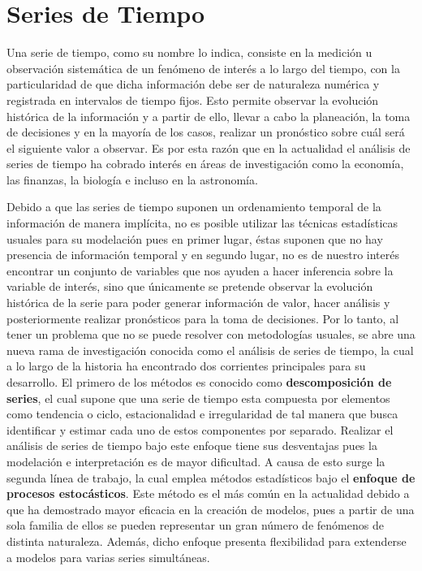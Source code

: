 \section{Series de Tiempo} \label{chap:I(d)}

Una serie de tiempo, como su nombre lo indica, consiste en la medición u observación sistemática de un fenómeno de interés a lo largo del tiempo, con la particularidad de que dicha información debe ser de naturaleza numérica y registrada en intervalos de tiempo fijos.  Esto permite observar la evolución histórica de la información y a partir de ello, llevar a cabo la planeación, la toma de decisiones y en la mayoría de los casos, realizar un pronóstico sobre cuál será el siguiente valor a observar. Es por esta razón que en la actualidad el análisis de series de tiempo ha cobrado interés en áreas de investigación como la economía, las finanzas, la biología e incluso en la astronomía.\newline

Debido a que las series de tiempo suponen un ordenamiento temporal de la información de manera implícita, no es posible utilizar las técnicas estadísticas usuales para su modelación pues en primer lugar, éstas suponen que no hay presencia de información temporal y en segundo lugar, no es de nuestro interés encontrar un conjunto de variables que nos ayuden a hacer inferencia sobre la variable de interés, sino que únicamente se pretende observar la evolución histórica de la serie para poder generar información de valor, hacer análisis y posteriormente realizar pronósticos para la toma de decisiones. Por lo tanto, al tener un problema que no se puede resolver con metodologías usuales, se abre una nueva rama de investigación conocida como el análisis de series de tiempo, la cual a lo largo de la historia ha encontrado dos corrientes principales para su desarrollo. El primero de los métodos es conocido como \textbf{descomposición de series}, el cual supone que una serie de tiempo esta compuesta por elementos como tendencia o ciclo, estacionalidad e irregularidad de tal manera que busca identificar y estimar cada uno de estos componentes por separado. Realizar el análisis de series de tiempo bajo este enfoque tiene sus desventajas pues la modelación e interpretación es de mayor dificultad. A causa de esto surge la segunda línea de trabajo, la cual emplea métodos estadísticos bajo el \textbf{enfoque de procesos estocásticos}. Este método es el más común en la actualidad debido a que ha demostrado mayor eficacia en la creación de modelos, pues a partir de una sola familia de ellos se pueden representar un gran número de fenómenos de distinta naturaleza. Además, dicho enfoque presenta flexibilidad para extenderse a modelos para varias series simultáneas.\newline


